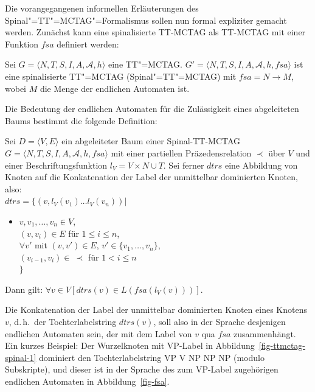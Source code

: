 Die vorangegangenen informellen Erläuterungen des Spinal"=TT"=MCTAG"=Formalismus sollen nun formal expliziter gemacht werden. Zunächst kann eine spinalisierte TT-MCTAG als TT-MCTAG mit einer Funktion $\mathit{fsa}$ definiert werden: 
\begin{definition}
Sei $G = \langle N,T,S,I,A,\mathcal{A},h\rangle$ eine TT"=MCTAG. $G' = \langle N,T,S,I,A,\mathcal{A},h,\mathit{fsa}\rangle$ ist eine spinalisierte TT"=MCTAG (Spinal"=TT"=MCTAG) mit $\mathit{fsa} = N \to M$, wobei $M$ die Menge der endlichen Automaten ist.
\end{definition}
Die Bedeutung der endlichen Automaten für die Zulässigkeit eines abgeleiteten Baums bestimmt die folgende Definition:
\begin{definition}
Sei $D = \langle V,E\rangle$ ein abgeleiteter Baum einer Spinal-TT-MCTAG $G = \langle N,T,S,I,A,\mathcal{A},h,\mathit{fsa}\rangle$ mit einer partiellen Präzedensrelation $\prec$ über $V$ und einer Beschriftungsfunktion $l_V = V \times N \cup T$. Sei ferner $\mathit{dtrs}$ eine Abbildung von Knoten auf die Konkatenation der Label der unmittelbar dominierten Knoten, also: \\[-1ex]

\noindent$\mathit{dtrs} = \{ (v, l_V(v_1)\ldots l_V(v_n)) |$ \\[-4ex]
\begin{itemize}
  \item[] $v, v_1, \ldots, v_n \in V$, \\
  $(v,v_i) \in E$ für $1 \leq i \leq n$, \\
  $\forall v'$ mit $(v,v') \in E$, $v' \in \{v_1, \ldots, v_n\}$, \\ 
  $(v_{i-1}, v_i) \in \ \prec$ für $1 < i \leq n$ \\[1.5ex] 
  $\}$	
\end{itemize}
Dann gilt: $\forall v \in V [ \mathit{dtrs}(v) \in L( \mathit{fsa}(l_V(v))) ]$.
\end{definition}
Die Konkatenation der Label der unmittelbar dominierten Knoten eines Knotens $v$, d.\,h.\ der Tochterlabelstring $\mathit{dtrs}(v)$, soll also in der Sprache desjenigen endlichen Automaten sein, der mit dem Label von $v$ qua $\mathit{fsa}$ zusammenhängt. Ein kurzes Beispiel: Der Wurzelknoten mit VP-Label in Abbildung~\ref{fig-ttmctag-spinal-1} dominiert den Tochterlabelstring VP V NP NP NP (modulo Subskripte), und dieser ist in der Sprache des zum VP-Label zugehörigen endlichen Automaten in Abbildung~\ref{fig-fsa}.

